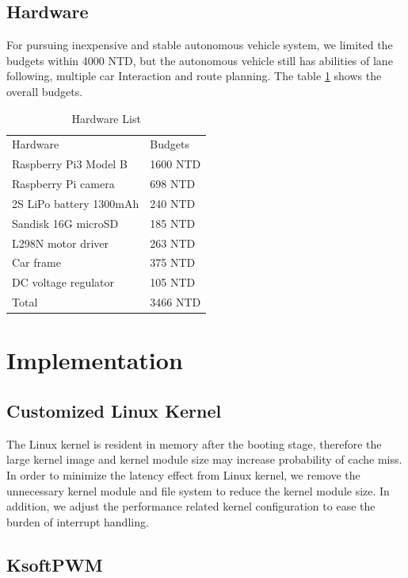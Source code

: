 \documentclass[conference]{IEEEtran}
\begin{document}
\subsection{Hardware}

For pursuing inexpensive and stable autonomous vehicle system, we limited the budgets within 4000 NTD, but the autonomous vehicle still has abilities of lane following, multiple car Interaction and route planning. The table \ref{hardware_list} shows the overall budgets.

\begin{table}
	\centering
	\caption{Hardware List}
	\label{hardware_list}
	\begin{tabular}{ll}
		Hardware                & Budgets  \\
		Raspberry Pi3 Model B   & 1600 NTD \\
		Raspberry Pi camera     & 698 NTD  \\
		2S LiPo battery 1300mAh & 240 NTD  \\
		Sandisk 16G microSD     & 185 NTD  \\
		L298N motor driver      & 263 NTD  \\
		Car frame               & 375 NTD  \\
		DC voltage regulator    & 105 NTD  \\
		Total                   & 3466 NTD
	\end{tabular}
\end{table}
\FloatBarrier

\section{Implementation}
\subsection{Customized Linux Kernel}

The Linux kernel is resident in memory after the booting stage, therefore the large kernel image and kernel module size may increase probability of cache miss. In order to minimize the latency effect from Linux kernel, we remove the unnecessary kernel module and file system to reduce the kernel module size. In addition, we adjust the performance related kernel configuration to ease the burden of interrupt handling.

\subsection{KsoftPWM}
\end{document}
